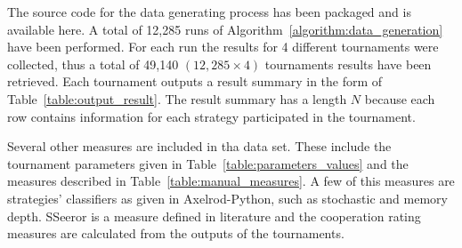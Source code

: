 \documentclass{article}
\begin{document}
The source code for the data generating process has been packaged and is
available here. A total of 12,285 runs of
Algorithm~\ref{algorithm:data_generation} have been performed. For each run the
results for 4 different tournaments were collected, thus a total of 49,140
$(12,285 \times 4)$ tournaments results have been retrieved. Each tournament
outputs a result summary in the form of Table~\ref{table:output_result}. The
result summary has a length \(N\) because each row contains information for each
strategy participated in the tournament.

\begin{table}[h]
    \begin{center}
\end{center}
\caption{Output result.}\label{table:output_result}
\end{table}

Several other measures are included in tha data set. These include the tournament
parameters given in Table~\ref{table:parameters_values} and the measures
described in Table~\ref{table:manual_measures}. A few of this measures are
strategies' classifiers as given in Axelrod-Python, such as stochastic and
memory depth. SSeeror is a measure defined in literature and the cooperation
rating measures are calculated from the outputs of the tournaments.
\end{document}

